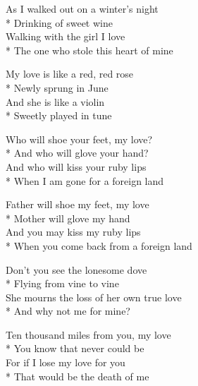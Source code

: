 

\versemark
As I walked out on a winter’s night\\*
Drinking of sweet wine\\
Walking with the girl I love\\*
The one who stole this heart of mine

My love is like a red, red rose\\*
Newly sprung in June\\
And she is like a violin\\*
Sweetly played in tune


\versemark
Who will shoe your feet, my love?\\*
And who will glove your hand?\\
And who will kiss your ruby lips\\*
When I am gone for a foreign land

Father will shoe my feet, my love\\*
Mother will glove my hand\\
And you may kiss my ruby lips\\*
When you come back from a foreign land 

\versemark
Don’t you see the lonesome dove\\*
Flying from vine to vine\\
She mourns the loss of her own true love\\*
And why not me for mine?

Ten thousand miles from you, my love\\*
You know that never could be\\
For if I lose my love for you\\*
That would be the death of me \doublerefrain

